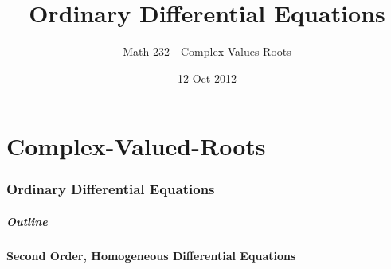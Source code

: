 \part{Complex-Valued-Roots}
\section{Ordinary Differential Equations}

\title{Ordinary Differential Equations}
\subtitle{Math 232 - Complex Values Roots}
\date{12 Oct 2012}

\begin{frame}
  \titlepage
\end{frame}

\begin{frame}
  \frametitle{Outline}
\end{frame}


\subsection{Second Order, Homogeneous Differential Equations}

